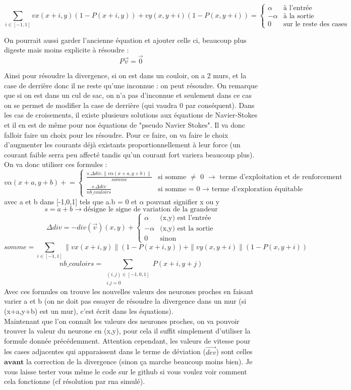 \documentclass[10pt]{article}
\newcommand{\pluseq}{\mathrel{+}=}
\begin{document}
\[ \sum_{i\in[-1,1]}vx(x+i,y)(1-P(x+i,y))+vy(x,y+i)(1-P(x,y+i)) = 
\begin{cases}
	\alpha & \text{à l'entrée} \\
	-\alpha & \text{à la sortie} \\
	0 & \text{sur le reste des cases}
\end{cases}
\] 

On pourrait aussi garder l'ancienne équation et ajouter celle ci, beaucoup plus digeste mais moins explicite à résoudre :
\[P\overrightarrow{v} = \overrightarrow{0} \]

Ainsi pour résoudre la divergence, si on est dans un couloir, on a 2 murs, et la case de derrière donc il ne reste qu'une inconnue : on peut résoudre. On remarque que si on est dans un cul de sac, on n'a pas d'inconnue et seulement dans ce cas on se permet de modifier la case de derrière (qui vaudra 0 par conséquent). Dans les cas de croisements, il existe plusieurs solutions aux équations de Navier-Stokes et il en est de même pour nos équations de "pseudo Navier Stokes". Il va donc falloir faire un choix pour les résoudre. Pour ce faire, on va faire le choix d'augmenter les courants déjà existants proportionnellement à leur force (un courant faible serra peu affecté tandis qu'un courant fort variera beaucoup plus). On va donc utiliser ces formules :
\[v\alpha(x+a,y+b) \pluseq 
\begin{cases}
	\frac{s.\Delta div.\|v\alpha(x+a,y+b)\|}{somme} & \text{si somme $\neq$ 0 $\rightarrow$ terme d'exploitation et de renforcement} \\
	\frac{s.\Delta div}{nb\_couloirs} & \text{si somme = 0 $\rightarrow$ terme d'exploration équitable}
\end{cases}
\]
avec a et b dans [-1,0,1] tels que a.b = 0 et $\alpha$ pouvant signifier x ou y
\[s = a+b \rightarrow\text{désigne le signe de variation de la grandeur}\]
\[\Delta div = - div(\overrightarrow{v})(x,y) +
\begin{cases}
	\alpha & \text{(x,y) est l'entrée} \\
	-\alpha & \text{(x,y) est la sortie} \\
	0 & \text{sinon}
\end{cases}
\]
\[somme = \sum_{i\in[-1,1]}\|vx(x+i,y)\|(1-P(x+i,y))+\|vy(x,y+i)\|(1-P(x,y+i)) \]
\[nb\_couloirs = \sum_{\substack{(i,j)\in[-1,0,1]\\i.j=0}}{P(x+i,y+j)}\]
Avec ces formules on trouve les nouvelles valeurs des neurones proches en faisant varier a et b (on ne doit pas essayer de résoudre la divergence dans un mur (si (x+a,y+b) est un mur), c'est écrit dans les équations). \\
Maintenant que l'on connaît les valeurs des neurones proches, on va pouvoir trouver la valeur du neurone en (x,y), pour cela il suffit simplement d'utiliser la formule donnée précédemment. Attention cependant, les valeurs de vitesse pour les cases adjacentes qui apparaissent dans le terme de déviation ($\overrightarrow{dev}$) sont celles $\textbf{avant}$ la correction de la divergence (sinon ça marche beaucoup moins bien).
Je vous laisse tester vous même le code sur le github si vous voulez voir comment cela fonctionne (cf résolution par rna simulé).
\end{document}
